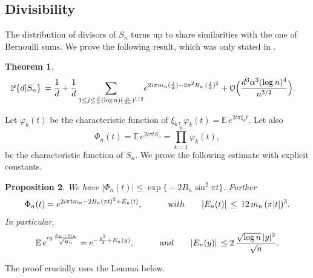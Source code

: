 \documentclass[11pt,draft,reqno]{amsart}
\newtheorem{theorem}{Theorem}[section]
\newtheorem{proposition}[theorem]{Proposition}
\theoremstyle{definition}
\theoremstyle{remarks}
\numberwithin{equation}{section}
\def \a{{\alpha}}
\def \p{{\varphi}}
\def \qq{{\qquad}}
\def\P{{\mathcal P}}
\def\E{{\mathbb E \,}}
\def\P{{\mathbb P}}
\begin{document}
 \subsection{Divisibility}The distribution of divisors of $S_n$ turns up to share similarities with the one of Bernoulli sums. We prove the following result, which was only stated  in   \cite{W8}.
 \begin{theorem}\label{Cramer.div.Sn}
\begin{align*}   
\P\{d|S_n\}   \, = \frac{1}{d}  + \frac{1}{d}\sum_{  1\le  j\le \frac{d}{\pi}( \log n)  ( { \a \over 2 n} )^{1/2}} &  e^{ 2i \pi m_n(\frac{j}{d})  - 2\pi^2  B_n\,(\frac{j}{d})^2  }  +\mathcal O \Big(   \frac{d^3 \a^3(\log n)^4}{n^{3/2}}   \Big)
.
\end{align*}
\end{theorem}
    
  
  Let $\p_k(t)$ be the characteristic function of $\xi_k$, $\p_k(t)= \E e^{2i\pi \xi_k t}$. Let also 
$$\Phi_n (t)=\E e^{2i\pi tS_n}= \prod_{k=1}^n\p_k(t) ,  $$
be the characteristic function of $S_n$.  We  prove the following estimate with explicit constants.
\begin{proposition}\label{Cramer.Phin} We have
$|\Phi_n(t)|\le \exp\big\{- 2B_n\sin^2\pi t  \big\} $.
Further
\begin{equation*}
  \Phi_n (t)= e^{ 2i \pi tm_n -  2   B_n  (\pi t)^2  + E_n(t)  },
    \qq \quad {\text with}\qquad |E_n(t)| \,\le\,  12\,m_n\, (\pi  |t|)^3.
\end{equation*}
In particular,  
\begin{equation*}
  \E e^{ iy\, \frac{S_n-m_n}{\sqrt {B_n}} }= e^{    - \frac{y^2}{2}    + E_n(y)  }, \qq \quad {\text and}\qquad |E_n(y)| \, \le  2 \, \frac{\sqrt {\log n}\,|y|^3}{\sqrt {n}}   .
 \end{equation*}

 \end{proposition} 
The proof crucially uses the Lemma below. 
  
\end{document}
